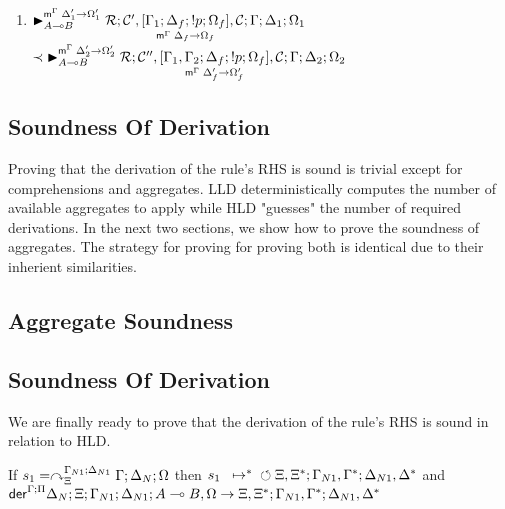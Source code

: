 \begin{enumerate}[leftmargin=*]
   \item $\matstate{A \lolli B}{\rulestk}{\lstack{C'},
      \pframe{\Gamma_1}{\Delta_f}{\bang p}{\Omega_f}{\Delta_f}{\Omega_f},
   \lstack{C}}{\Gamma}{\Delta_1}{\Omega_1}{\Delta'_1 \rightarrow \Omega'_1}$\\
   \hspace*{1cm} $\prec \matstate{A \lolli B}{\rulestk}{\lstack{C''},
      \pframe{\Gamma_1, \Gamma_2}{\Delta_f}{\bang p}{\Omega_f}{\Delta'_f}{\Omega'_f},
      \lstack{C}}{\Gamma}{\Delta_2}{\Omega_2}{\Delta'_2 \rightarrow \Omega'_2}$

\end{enumerate}

\subsection{Soundness Of Derivation}

Proving that the derivation of the rule's RHS is sound is trivial except
for comprehensions and aggregates. LLD deterministically computes the number of
available aggregates to apply while HLD "guesses" the number of required
derivations.  In the next two sections, we show how to prove the soundness of
aggregates. The strategy for proving for proving both is identical due to their
inherient similarities.

\subsection{Aggregate Soundness}



\subsection{Soundness Of Derivation}

We are finally ready to prove that the derivation of the rule's RHS is sound in
relation to HLD.

\begin{lemma}\label{thm:head_derivation_soundness}
If $s_1 = \derstatex{\Gamma}{\Delta_N}{\Xi}{\Gamma_{N1}}{\Delta_{N1}}{\Omega}$
then $\transs{s_1}{\finalstate{\Xi, \Xi^{*}}{\Gamma_{N1},
      \Gamma^{*}}{\Delta_{N1}, \Delta^{*}}}$ and
$\dz{\Gamma}{\Pi}{\Delta_N}{\Xi}{\Gamma_{N1}}{\Delta_{N1}}{A \lolli B,
   \Omega}{\Xi, \Xi^{*}; \Gamma_{N1}, \Gamma^{*}; \Delta_{N1}, \Delta^{*}}$
\end{lemma}

